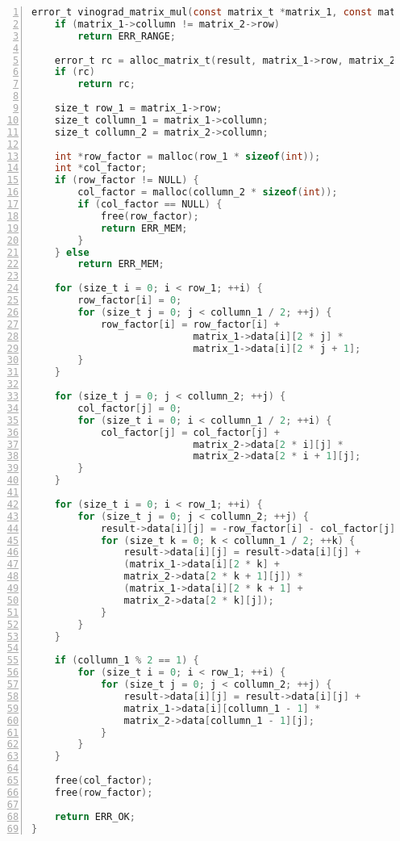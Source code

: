 \clearpage

\begin{center}
\captionsetup{justification=raggedright,singlelinecheck=off}
\begin{lstlisting}[language=C, frame=single, numbers=left, label=lst:vinograd,caption=Реализация алгоритма Винограда]
error_t vinograd_matrix_mul(const matrix_t *matrix_1, const matrix_t *matrix_2, matrix_t *result) {
    if (matrix_1->collumn != matrix_2->row)
        return ERR_RANGE;

    error_t rc = alloc_matrix_t(result, matrix_1->row, matrix_2->collumn);
    if (rc)
        return rc;

    size_t row_1 = matrix_1->row;
    size_t collumn_1 = matrix_1->collumn;
    size_t collumn_2 = matrix_2->collumn;

    int *row_factor = malloc(row_1 * sizeof(int));
    int *col_factor;
    if (row_factor != NULL) {
        col_factor = malloc(collumn_2 * sizeof(int));
        if (col_factor == NULL) {
            free(row_factor);
            return ERR_MEM;
        }
    } else
        return ERR_MEM;

    for (size_t i = 0; i < row_1; ++i) {
        row_factor[i] = 0;
        for (size_t j = 0; j < collumn_1 / 2; ++j) {
            row_factor[i] = row_factor[i] +
                            matrix_1->data[i][2 * j] * 
                            matrix_1->data[i][2 * j + 1];
        }
    }

    for (size_t j = 0; j < collumn_2; ++j) {
        col_factor[j] = 0;
        for (size_t i = 0; i < collumn_1 / 2; ++i) {
            col_factor[j] = col_factor[j] +
                            matrix_2->data[2 * i][j] * 
                            matrix_2->data[2 * i + 1][j];
        }
    }

    for (size_t i = 0; i < row_1; ++i) {
        for (size_t j = 0; j < collumn_2; ++j) {
            result->data[i][j] = -row_factor[i] - col_factor[j];
            for (size_t k = 0; k < collumn_1 / 2; ++k) {
                result->data[i][j] = result->data[i][j] + 
                (matrix_1->data[i][2 * k] +
                matrix_2->data[2 * k + 1][j]) * 
                (matrix_1->data[i][2 * k + 1] + 
                matrix_2->data[2 * k][j]);
            }
        }
    }

    if (collumn_1 % 2 == 1) {
        for (size_t i = 0; i < row_1; ++i) {
            for (size_t j = 0; j < collumn_2; ++j) {
                result->data[i][j] = result->data[i][j] +
                matrix_1->data[i][collumn_1 - 1] * 
                matrix_2->data[collumn_1 - 1][j];
            }
        }
    }

    free(col_factor);
    free(row_factor);

    return ERR_OK;
}
\end{lstlisting}
\end{center}


